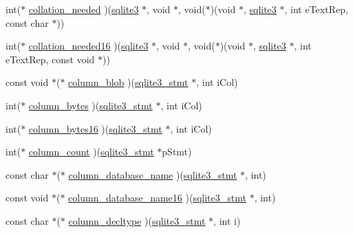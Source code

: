 \begin{DoxyCompactItemize}
\item 
int($\ast$ \hyperlink{structsqlite3__api__routines_a4ecc8645b639cabe1fb630aceaec9017}{collation\+\_\+needed} )(\hyperlink{sqlite3_8h_a0ef6f2646262c8a9b24368d8ac140f69}{sqlite3} $\ast$, void $\ast$, void($\ast$)(void $\ast$, \hyperlink{sqlite3_8h_a0ef6f2646262c8a9b24368d8ac140f69}{sqlite3} $\ast$, int e\+Text\+Rep, const char $\ast$))
\item 
int($\ast$ \hyperlink{structsqlite3__api__routines_aa035538977ec61fe6df923b78db33962}{collation\+\_\+needed16} )(\hyperlink{sqlite3_8h_a0ef6f2646262c8a9b24368d8ac140f69}{sqlite3} $\ast$, void $\ast$, void($\ast$)(void $\ast$, \hyperlink{sqlite3_8h_a0ef6f2646262c8a9b24368d8ac140f69}{sqlite3} $\ast$, int e\+Text\+Rep, const void $\ast$))
\item 
const void $\ast$($\ast$ \hyperlink{structsqlite3__api__routines_aea28365a58adb937fbdf3983fe080e1a}{column\+\_\+blob} )(\hyperlink{sqlite3_8h_af2a033da1327cdd77f0a174a09aedd0c}{sqlite3\+\_\+stmt} $\ast$, int i\+Col)
\item 
int($\ast$ \hyperlink{structsqlite3__api__routines_a4925c38851818eebce76de641da69636}{column\+\_\+bytes} )(\hyperlink{sqlite3_8h_af2a033da1327cdd77f0a174a09aedd0c}{sqlite3\+\_\+stmt} $\ast$, int i\+Col)
\item 
int($\ast$ \hyperlink{structsqlite3__api__routines_a7355fc82d2138b79b2e188fd2de4d269}{column\+\_\+bytes16} )(\hyperlink{sqlite3_8h_af2a033da1327cdd77f0a174a09aedd0c}{sqlite3\+\_\+stmt} $\ast$, int i\+Col)
\item 
int($\ast$ \hyperlink{structsqlite3__api__routines_a3a41d82a8b13513a505889c8c9b1c97e}{column\+\_\+count} )(\hyperlink{sqlite3_8h_af2a033da1327cdd77f0a174a09aedd0c}{sqlite3\+\_\+stmt} $\ast$p\+Stmt)
\item 
const char $\ast$($\ast$ \hyperlink{structsqlite3__api__routines_acd92d7b8700122a8c352d9f03c8fad37}{column\+\_\+database\+\_\+name} )(\hyperlink{sqlite3_8h_af2a033da1327cdd77f0a174a09aedd0c}{sqlite3\+\_\+stmt} $\ast$, int)
\item 
const void $\ast$($\ast$ \hyperlink{structsqlite3__api__routines_a3e38edb955dbd932717bb11283b65490}{column\+\_\+database\+\_\+name16} )(\hyperlink{sqlite3_8h_af2a033da1327cdd77f0a174a09aedd0c}{sqlite3\+\_\+stmt} $\ast$, int)
\item 
const char $\ast$($\ast$ \hyperlink{structsqlite3__api__routines_ae4e78358b212d7d37aa3a47058614c6f}{column\+\_\+decltype} )(\hyperlink{sqlite3_8h_af2a033da1327cdd77f0a174a09aedd0c}{sqlite3\+\_\+stmt} $\ast$, int i)
\item 

\end{DoxyCompactItemize}
